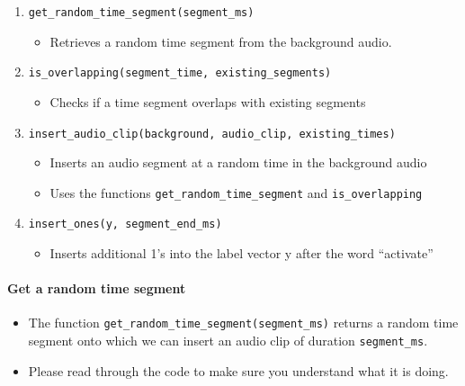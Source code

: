 \documentclass[11pt]{article}
\begin{document}
\begin{enumerate}
\def\labelenumi{\arabic{enumi}.}
\itemsep1pt\parskip0pt
\item
  \texttt{get\_random\_time\_segment(segment\_ms)}

  \begin{itemize}
  \itemsep1pt\parskip0pt
  \item
    Retrieves a random time segment from the background audio.
  \end{itemize}
\item
  \texttt{is\_overlapping(segment\_time, existing\_segments)}

  \begin{itemize}
  \itemsep1pt\parskip0pt
  \item
    Checks if a time segment overlaps with existing segments
  \end{itemize}
\item
  \texttt{insert\_audio\_clip(background, audio\_clip, existing\_times)}

  \begin{itemize}
  \itemsep1pt\parskip0pt
  \item
    Inserts an audio segment at a random time in the background audio
  \item
    Uses the functions \texttt{get\_random\_time\_segment} and
    \texttt{is\_overlapping}
  \end{itemize}
\item
  \texttt{insert\_ones(y, segment\_end\_ms)}

  \begin{itemize}
  \itemsep1pt\parskip0pt
  \item
    Inserts additional 1's into the label vector y after the word
    ``activate''
  \end{itemize}
\end{enumerate}

    \paragraph{Get a random time segment}\label{get-a-random-time-segment}

\begin{itemize}
\itemsep1pt\parskip0pt
\item
  The function \texttt{get\_random\_time\_segment(segment\_ms)} returns
  a random time segment onto which we can insert an audio clip of
  duration \texttt{segment\_ms}.
\item
  Please read through the code to make sure you understand what it is
  doing.
\end{itemize}
\end{document}
